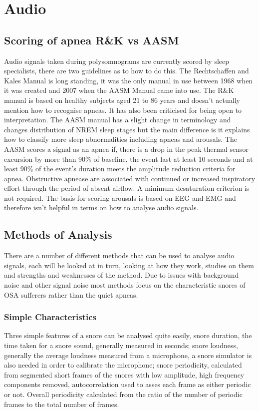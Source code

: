 \section{Audio}
\label{sec:audio-sophie}
\subsection{Scoring of apnea R\&K vs AASM}
Audio signals taken during polysomnograms are currently scored by sleep specialists, there are two guidelines as to how to do this. The Rechtschaffen and Kales Manual is long standing, it was the only manual in use between 1968 when it was created and 2007 when the AASM Manual came into use. 
The R\&K manual is based on healthy subjects aged 21 to 86 years and doesn’t actually mention how to recognise apneas. It has also been criticised for being open to interpretation. The AASM manual has a slight change in terminology and changes distribution of NREM sleep stages but the main difference is it explains how to classify more sleep abnormalities including apneas and arousals. 
The AASM scores a signal as an apnea if, there is a drop in the peak thermal sensor excursion by more than 90\% of baseline, the event last at least 10 seconds and at least 90\% of the event’s duration meets the amplitude reduction criteria for apnea. Obstructive apnease are associated with continued or increased inspiratory effort through the period of absent airflow. A minimum desaturation criterion is not required. 
The basis for scoring arousals is based on EEG and EMG and therefore isn’t helpful in terms on how to analyse audio signals. 

\subsection{Methods of Analysis}
There are a number of different methods that can be used to analyse audio signals, each will be looked at in turn, looking at how they work, studies on them and strengths and weaknesses of the method. Due to issues with background noise and other signal noise most methods focus on the characteristic snores of OSA sufferers rather than the quiet apneas. 

\subsubsection{Simple Characteristics}
Three simple features of a snore can be analysed quite easily, snore duration, the time taken for a snore sound, generally measured in seconds; snore loudness, generally the average loudness measured from a microphone, a snore simulator is also needed in order to calibrate the microphone; snore periodicity, calculated from segmented short frames of the snores with low amplitude, high frequency components removed, autocorrelation used to asses each frame as either periodic or not. Overall periodicity calculated from the ratio of the number of periodic frames to the total number of frames.

